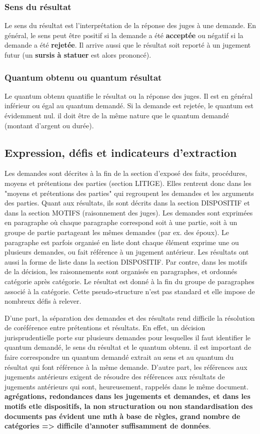 \subsubsection{Sens du résultat}
Le sens du résultat est l'interprétation de la réponse des juges à une demande. En général, le sens peut être positif si la demande a été \textbf{acceptée} ou négatif si la demande a été \textbf{rejetée}. Il arrive aussi que le résultat soit reporté à un jugement futur (un \textbf{sursis à statuer} est alors prononcé). 

\subsubsection{Quantum obtenu ou quantum résultat}
Le quantum obtenu quantifie le résultat ou la réponse des juges. Il est en général inférieur ou égal au quantum demandé. Si la demande est rejetée, le quantum est évidemment nul. il doit être de la même nature que le quantum demandé (montant d'argent ou durée).

\subsection{Expression, défis et indicateurs d'extraction}
Les demandes sont décrites à la fin de la section d'exposé des faits, procédures, moyens et prétentions des parties (section LITIGE). Elles rentrent donc dans les "moyens et prétentions des parties" qui regroupent les demandes et les arguments des parties. Quant aux résultats, ils sont décrits dans la section DISPOSITIF et dans la section MOTIFS (raisonnement des juges). Les demandes sont exprimées en paragraphe où chaque paragraphe correspond soit à une partie, soit à un groupe de partie partageant les mêmes demandes (par ex. des époux). Le paragraphe est parfois organisé en liste dont chaque élément exprime une ou plusieurs demandes, ou fait référence à un jugement antérieur. Les résultats ont aussi la forme de liste dans la section DISPOSITIF. Par contre, dans les motifs de la décision, les raisonnements sont organisés en paragraphes, et ordonnés catégorie après catégorie. Le résultat est donné à la fin du groupe de paragraphes associé à la catégorie. Cette pseudo-structure n'est pas standard et elle impose de nombreux défis à relever.

D'une part, la séparation des demandes et des résultats rend difficile la résolution de coréférence entre prétentions et résultats. En effet, un décision jurisprudentielle porte sur plusieurs demandes pour lesquelles il faut identifier le quantum demandé, le sens du résultat et le quantum obtenu. il est important de faire correspondre un quantum demandé extrait au sens et au quantum du résultat qui font référence à la même demande. D'autre part, les références aux jugements antérieurs exigent de résoudre des références aux résultats de jugements antérieurs qui sont, heureusement, rappelés dans le même document. \textbf{agrégations, redondances dans les jugements et demandes, et dans les motifs etle dispositifs, la non structuration ou non standardisation des documents pas évident une mth à base de règles, grand nombre de catégories => difficile d'annoter suffisamment de données}.

